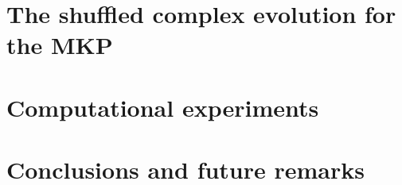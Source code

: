\documentclass[10pt, conference, compsocconf]{IEEEtran}
\begin{document}
\section{The shuffled complex evolution for the MKP}
\label{sec:sce}


\section{Computational experiments}
\label{sec:exp}


\section{Conclusions and future remarks}
\label{sec:conc}



%



\flushend
\end{document}
